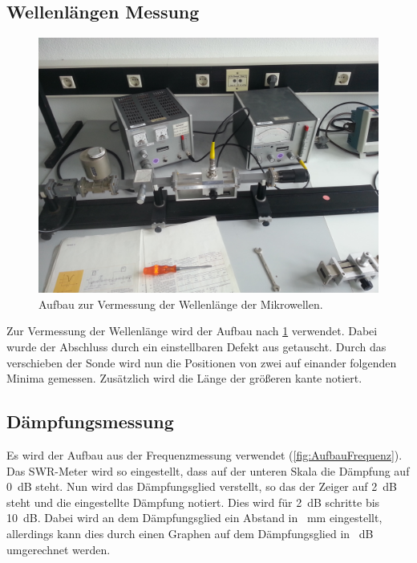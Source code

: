 \subsection{Wellenlängen Messung}\label{sec:Wellenlänge}
\begin{figure}[h!]
	\centering
	\includegraphics[scale = 0.1]{../Grafiken/Aufbau_3.jpg}
	\caption{Aufbau zur Vermessung der Wellenlänge der Mikrowellen.}\label{fig:AufbauWellenlänge}
\end{figure}
Zur Vermessung der Wellenlänge wird der Aufbau nach \cref{fig:AufbauWellenlänge} verwendet. Dabei wurde der Abschluss durch ein einstellbaren Defekt aus getauscht. Durch das verschieben der Sonde wird nun die Positionen von zwei auf einander folgenden Minima gemessen. Zusätzlich wird die Länge der größeren kante notiert.
\subsection{Dämpfungsmessung}
Es wird der Aufbau aus der Frequenzmessung verwendet (\cref{fig:AufbauFrequenz}). Das SWR-Meter wird so eingestellt, dass auf der unteren Skala die Dämpfung auf \SI{0}{\deci\bel} steht. Nun wird das Dämpfungsglied verstellt, so das der Zeiger auf \SI{2}{\deci\bel} steht und die eingestellte Dämpfung notiert. Dies wird für  \SI{2}{\deci\bel} schritte bis \SI{10}{\deci\bel}. Dabei wird an dem Dämpfungsglied ein Abstand in \SI{}{\milli\meter} eingestellt, allerdings kann dies durch einen Graphen auf dem Dämpfungsglied in \SI{}{\deci\bel} umgerechnet werden.
 \newpage
